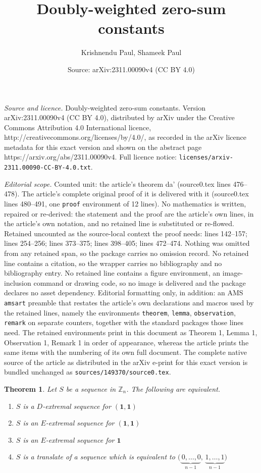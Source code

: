 \documentclass[10pt,a4paper]{amsart}
\title{Doubly-weighted zero-sum constants}
\author{Krishnendu Paul, Shameek Paul}
\date{Source: arXiv:2311.00090v4 (CC BY 4.0)}
\newtheorem{theorem}{Theorem}
\begin{document}
\maketitle

\noindent\emph{Source and licence.} Doubly-weighted zero-sum constants. Version arXiv:2311.00090v4 (CC BY 4.0), distributed by arXiv under the Creative Commons Attribution 4.0 International licence, http://creativecommons.org/licenses/by/4.0/, as recorded in the arXiv licence metadata for this exact version and shown on the abstract page https://arxiv.org/abs/2311.00090v4. Full licence notice: \texttt{licenses/arxiv-2311.00090-CC-BY-4.0.txt}.\par\smallskip

\noindent\textit{Editorial scope.} Counted unit: the article's theorem da' (source0.tex lines 476--478). The article's complete original proof of it is delivered with it (source0.tex lines 480--491, one \texttt{proof} environment of 12 lines). No mathematics is written, repaired or re-derived: the statement and the proof are the article's own lines, in the article's own notation, and no retained line is substituted or re-flowed.  Retained uncounted as the source-local context the proof needs: lines 142--157; lines 254--256; lines 373--375; lines 398--405; lines 472--474.  Nothing was omitted from any retained span, so the package carries no omission record.  No retained line contains a citation, so the wrapper carries no bibliography and no bibliography entry.  No retained line contains a figure environment, an image-inclusion command or drawing code, so no image is delivered and the package declares no asset dependency.  Editorial formatting only, in addition: an AMS \texttt{amsart} preamble that restates the article's own declarations and macros used by the retained lines, namely the environments \texttt{theorem}, \texttt{lemma}, \texttt{observation}, \texttt{remark} on separate counters, together with the standard packages those lines need.  The retained environments print in this document as Theorem 1, Lemma 1, Observation 1, Remark 1 in order of appearance, whereas the article prints the same items with the numbering of its own full document.  The complete native source of the article as distributed in the arXiv e-print for this exact version is bundled unchanged as \texttt{sources/149370/source0.tex}.
\begin{theorem}\label{11}
Let $S$ be a sequence in $\mathbb Z_n$. The following are equivalent.
\begin{enumerate}[label=(\arabic*),ref=(\arabic*)]
\item[$(a)$]
$S$ is a $D$-extremal sequence for $(\mathbf 1,\mathbf 1)$

\item[$(b)$]
$S$ is an $E$-extremal sequence for $(\mathbf 1,\mathbf 1)$

\item[$(c)$]
$S$ is an $E$-extremal sequence for $\mathbf 1$

\item[$(d)$]
$S$ is a translate of a sequence which is equivalent to $\big(\underbrace{\,0,\ldots,0}_{n-1},\,\underbrace{1,\ldots,1}_{n-1}\big)$
\end{enumerate}
\end{theorem}
\end{document}
